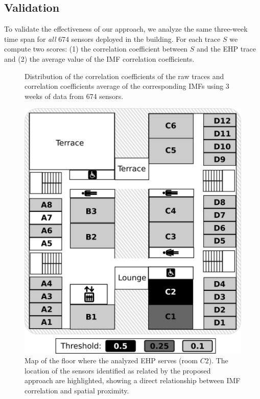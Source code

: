 \subsection{Validation}
To validate the effectiveness of our approach, we analyze the same three-week time span for \emph{all} 674 
sensors deployed in the building.
For each trace $S$ we compute two scores: (1) the correlation coefficient between $S$ and the EHP trace
and (2) the average value of the IMF correlation coefficients.

\begin{figure}[tbh!]
\centering
 \caption{Distribution of the correlation coefficients of the raw traces and correlation coefficients average of the corresponding IMFs using 3 weeks of data from 674 sensors.}
\label{fig:histo}
\end{figure}

\begin{figure}
\centering
\includegraphics[width=.45\textwidth]{figs/floorMap.png}
\caption{Map of the floor where the analyzed EHP serves (room $C2$). The location of the sensors identified as related by the proposed approach are highlighted, showing a direct relationship between IMF correlation and spatial proximity.}
\label{fig:map}
\end{figure}

